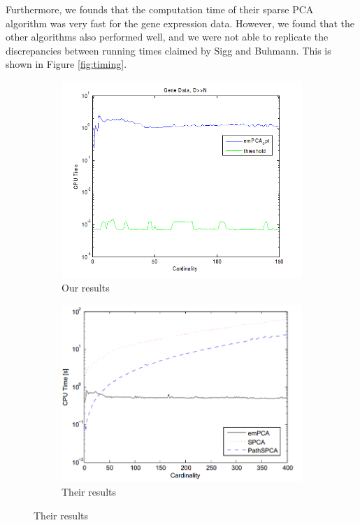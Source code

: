 \documentclass{article}
\begin{document}
Furthermore, we founds that the computation time of their sparse
PCA algorithm was very fast for the gene expression data.
However, we found that the other algorithms also performed well,
and we were not able to replicate the discrepancies between
running times claimed by Sigg and Buhmann.
This is shown in Figure \ref{fig:timing}.

\begin{figure}[h,width=\textwidth]
\caption{Running time versus cardinality}
\label{fig:timing}
\begin{subfigure}{0.5\textwidth}
\caption{Our results}
\includegraphics[width=\textwidth]{6.png}
\end{subfigure}
\begin{subfigure}{0.5\textwidth}
\caption{Their results}
\includegraphics[width=\textwidth]{5.png}
\end{subfigure}
\end{figure}
\end{document}

